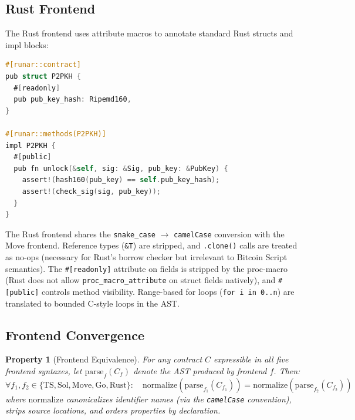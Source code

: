 \documentclass[11pt,a4paper]{article}
\newtheorem{property}[theorem]{Property}
\begin{document}
\subsection{Rust Frontend}
\label{sec:frontend-rs}

The Rust frontend uses attribute macros to annotate standard Rust structs and
impl blocks:

\begin{lstlisting}[style=runar,language=C,
  morekeywords={pub,struct,impl,fn,let,mut,self,use}]
#[runar::contract]
pub struct P2PKH {
  #[readonly]
  pub pub_key_hash: Ripemd160,
}

#[runar::methods(P2PKH)]
impl P2PKH {
  #[public]
  pub fn unlock(&self, sig: &Sig, pub_key: &PubKey) {
    assert!(hash160(pub_key) == self.pub_key_hash);
    assert!(check_sig(sig, pub_key));
  }
}
\end{lstlisting}

The Rust frontend shares the \texttt{snake\_case} $\to$ \texttt{camelCase}
conversion with the Move frontend. Reference types (\texttt{\&T}) are
stripped, and \texttt{.clone()} calls are treated as no-ops (necessary for
Rust's borrow checker but irrelevant to Bitcoin Script semantics).
The \texttt{\#[readonly]} attribute on fields is stripped by the proc-macro
(Rust does not allow \texttt{proc\_macro\_attribute} on struct fields
natively), and \texttt{\#[public]} controls method visibility.
Range-based for loops (\texttt{for i in 0..n}) are translated to
bounded C-style loops in the AST.

\subsection{Frontend Convergence}
\label{sec:convergence}

\begin{property}[Frontend Equivalence]
\label{prop:frontend-equiv}
For any contract $C$ expressible in all five frontend syntaxes, let
$\text{parse}_f(C_f)$ denote the AST produced by frontend $f$. Then:
\[
  \forall f_1, f_2 \in \{\text{TS}, \text{Sol}, \text{Move}, \text{Go}, \text{Rust}\}:
  \quad \text{normalize}(\text{parse}_{f_1}(C_{f_1})) = \text{normalize}(\text{parse}_{f_2}(C_{f_2}))
\]
where $\text{normalize}$ canonicalizes identifier names (via the
\texttt{camelCase} convention), strips source locations, and orders
properties by declaration.
\end{property}
\end{document}
